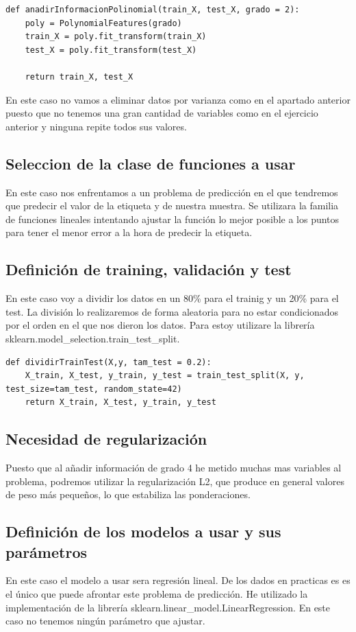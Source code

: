 \documentclass[titlepage]{article}
\begin{document}
\begin{lstlisting}
def anadirInformacionPolinomial(train_X, test_X, grado = 2):
	poly = PolynomialFeatures(grado)
	train_X = poly.fit_transform(train_X)
	test_X = poly.fit_transform(test_X)
	
	return train_X, test_X
\end{lstlisting}

En este caso no vamos a eliminar datos por varianza como en el apartado anterior puesto que no tenemos una gran cantidad de variables como en el ejercicio anterior y ninguna repite todos sus valores.

\subsection{Seleccion de la clase de funciones a usar}
En este caso nos enfrentamos a un problema de predicción en el que tendremos que predecir el valor de la etiqueta y de nuestra muestra. Se utilizara la familia de funciones lineales intentando ajustar la función lo mejor posible a los puntos para tener el menor error a la hora de predecir la etiqueta.

\subsection{Definición de training, validación y test}
En este caso voy a dividir los datos en un 80\% para el trainig y un 20\% para el test. La división lo realizaremos de forma aleatoria para no estar condicionados por el orden en el que nos dieron los datos. Para estoy utilizare la librería sklearn.model\_selection.train\_test\_split.

\begin{lstlisting}
def dividirTrainTest(X,y, tam_test = 0.2):
	X_train, X_test, y_train, y_test = train_test_split(X, y, test_size=tam_test, random_state=42)
	return X_train, X_test, y_train, y_test
\end{lstlisting}

\subsection{Necesidad de regularización}
Puesto que al añadir información de grado 4 he metido muchas mas variables al problema, podremos utilizar la regularización L2, que produce en general valores de peso más pequeños, lo que estabiliza las ponderaciones.

\subsection{Definición de los modelos a usar y sus parámetros}
En este caso el modelo a usar sera regresión lineal. De los dados en practicas es es el único que puede afrontar este problema de predicción. He utilizado la implementación de la librería sklearn.linear\_model.LinearRegression. En este caso no tenemos ningún parámetro que ajustar.
\end{document}
